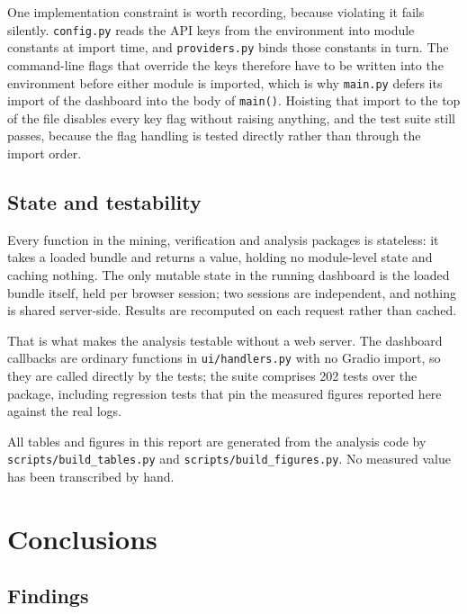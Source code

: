 \documentclass[12pt,a4paper]{article}
\begin{document}
One implementation constraint is worth recording, because violating it fails
silently. \texttt{config.py} reads the API keys from the environment into module
constants at import time, and \texttt{providers.py} binds those constants in
turn. The command-line flags that override the keys therefore have to be written
into the environment before either module is imported, which is why
\texttt{main.py} defers its import of the dashboard into the body of
\texttt{main()}. Hoisting that import to the top of the file disables every key
flag without raising anything, and the test suite still passes, because the flag
handling is tested directly rather than through the import order.

\subsection{State and testability}

Every function in the mining, verification and analysis packages is stateless:
it takes a loaded bundle and returns a value, holding no module-level state and
caching nothing. The only mutable state in the running dashboard is the loaded
bundle itself, held per browser session; two sessions are independent, and
nothing is shared server-side. Results are recomputed on each request rather
than cached.

That is what makes the analysis testable without a web server. The dashboard
callbacks are ordinary functions in \texttt{ui/handlers.py} with no Gradio
import, so they are called directly by the tests; the suite comprises 202 tests
over the package, including regression tests that pin the measured figures
reported here against the real logs.

All tables and figures in this report are generated from the analysis code by
\texttt{scripts/build\_tables.py} and \texttt{scripts/build\_figures.py}. No
measured value has been transcribed by hand.

\section{Conclusions}\label{sec:conclusions}

\subsection{Findings}
\end{document}
